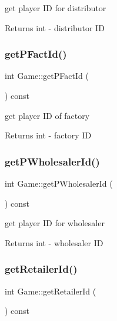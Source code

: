 get player ID for distributor \begin{DoxyReturn}{Returns}
int -\/ distributor ID 
\end{DoxyReturn}
\mbox{\label{classGame_a39a79914de4376873a17d90e5c916b10}} 
\subsubsection{\texorpdfstring{get\+P\+Fact\+Id()}{getPFactId()}}
{\footnotesize\ttfamily int Game\+::get\+P\+Fact\+Id (\begin{DoxyParamCaption}{ }\end{DoxyParamCaption}) const}

get player ID of factory \begin{DoxyReturn}{Returns}
int -\/ factory ID 
\end{DoxyReturn}
\mbox{\label{classGame_af6934f2c39a6c6c99519f6081b56d6b7}} 
\subsubsection{\texorpdfstring{get\+P\+Wholesaler\+Id()}{getPWholesalerId()}}
{\footnotesize\ttfamily int Game\+::get\+P\+Wholesaler\+Id (\begin{DoxyParamCaption}{ }\end{DoxyParamCaption}) const}

get player ID for wholesaler \begin{DoxyReturn}{Returns}
int -\/ wholesaler ID 
\end{DoxyReturn}
\mbox{\label{classGame_add0239e447bd78f762a53f75da31f07e}} 
\subsubsection{\texorpdfstring{get\+Retailer\+Id()}{getRetailerId()}}
{\footnotesize\ttfamily int Game\+::get\+Retailer\+Id (\begin{DoxyParamCaption}{ }\end{DoxyParamCaption}) const}


